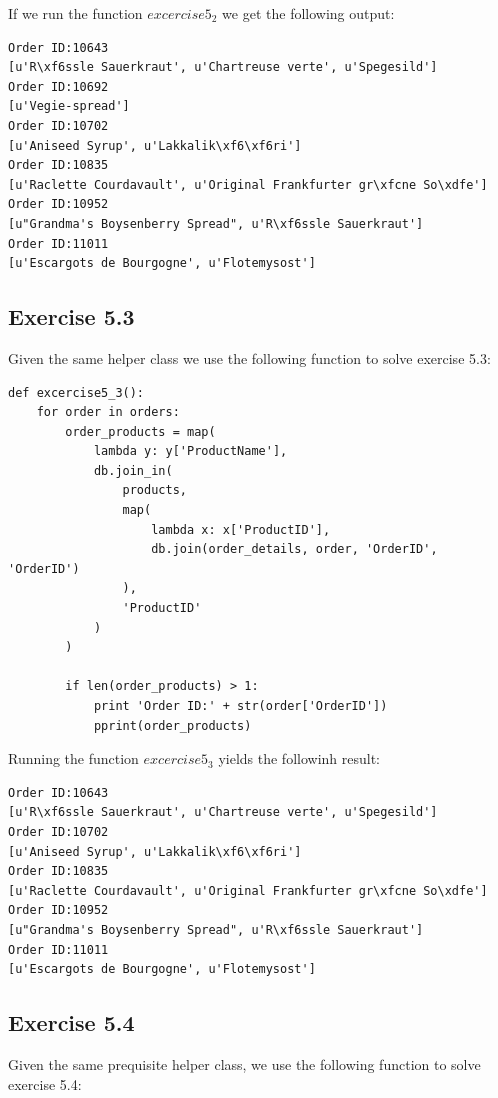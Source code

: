 \documentclass{article}
\begin{document}
If we run the function $excercise5_2$ we get the following output:

\begin{lstlisting}
Order ID:10643
[u'R\xf6ssle Sauerkraut', u'Chartreuse verte', u'Spegesild']
Order ID:10692
[u'Vegie-spread']
Order ID:10702
[u'Aniseed Syrup', u'Lakkalik\xf6\xf6ri']
Order ID:10835
[u'Raclette Courdavault', u'Original Frankfurter gr\xfcne So\xdfe']
Order ID:10952
[u"Grandma's Boysenberry Spread", u'R\xf6ssle Sauerkraut']
Order ID:11011
[u'Escargots de Bourgogne', u'Flotemysost']
\end{lstlisting}

\subsection{Exercise 5.3}
\label{sub:Exercise 5.3}

Given the same helper class we use the following function to solve exercise 5.3:

\begin{lstlisting}
def excercise5_3():
    for order in orders:
        order_products = map(
            lambda y: y['ProductName'],
            db.join_in(
                products,
                map(
                    lambda x: x['ProductID'],
                    db.join(order_details, order, 'OrderID', 'OrderID')
                ),
                'ProductID'
            )
        )

        if len(order_products) > 1:
            print 'Order ID:' + str(order['OrderID'])
            pprint(order_products)
\end{lstlisting}

Running the function $excercise5_3$ yields the followinh result:

\begin{lstlisting}
Order ID:10643
[u'R\xf6ssle Sauerkraut', u'Chartreuse verte', u'Spegesild']
Order ID:10702
[u'Aniseed Syrup', u'Lakkalik\xf6\xf6ri']
Order ID:10835
[u'Raclette Courdavault', u'Original Frankfurter gr\xfcne So\xdfe']
Order ID:10952
[u"Grandma's Boysenberry Spread", u'R\xf6ssle Sauerkraut']
Order ID:11011
[u'Escargots de Bourgogne', u'Flotemysost']
\end{lstlisting}

\subsection{Exercise 5.4}
\label{sub:Exercise 5.4}

Given the same prequisite helper class, we use the following function to solve exercise 5.4:
\end{document}
